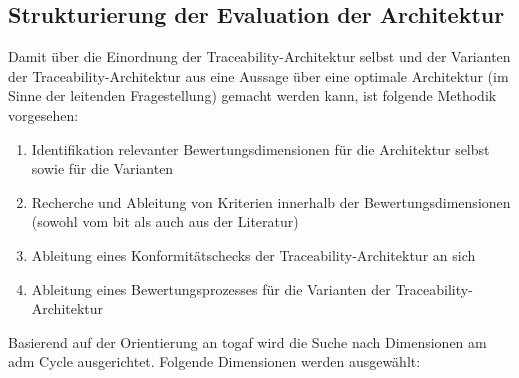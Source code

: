 \subsection{Strukturierung der Evaluation der Architektur}
\label{sec:methodik-evaluation}

Damit über die Einordnung der Traceability-Architektur selbst und der Varianten der Traceability-Architektur aus  eine Aussage über eine optimale Architektur (im Sinne der leitenden Fragestellung) gemacht werden kann, ist folgende Methodik vorgesehen:

\begin{enumerate}
    \item Identifikation relevanter Bewertungsdimensionen für die Architektur selbst sowie für die Varianten
    \item Recherche und Ableitung von Kriterien innerhalb der Bewertungsdimensionen (sowohl vom \ac{bit} als auch aus der Literatur)
    \item Ableitung eines Konformitätschecks der Traceability-Architektur an sich
    \item Ableitung eines Bewertungsprozesses für die Varianten der Traceability-Architektur
    
\end{enumerate}

Basierend auf der Orientierung an \ac{togaf} wird die Suche nach Dimensionen am \ac{adm} Cycle ausgerichtet. Folgende Dimensionen werden ausgewählt:

